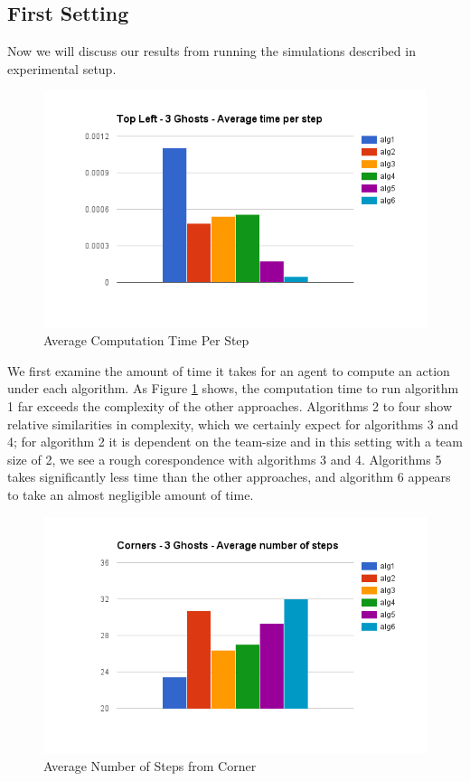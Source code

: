 \documentclass[11pt]{article}
\begin{document}
\begin{multicols}{2}
\subsection{First Setting}
Now we will discuss our results from running the simulations described in experimental setup. 


\begin{figure}[H]
	\includegraphics[width=\columnwidth]{time.png}
	\caption{Average Computation Time Per Step}
	\label{fig:averagecomputation}
\end{figure}	

We first examine the amount of time it takes for an agent to compute an action under each algorithm. As Figure \ref{fig:averagecomputation} shows, the computation time to run algorithm 1 far exceeds the complexity of the other approaches. Algorithms 2 to four show relative similarities in complexity, which we certainly expect for algorithms 3 and 4; for algorithm 2 it is dependent on the team-size and in this setting with a team size of 2, we see a rough corespondence with algorithms 3 and 4. Algorithms 5 takes significantly less time than the other approaches, and algorithm 6 appears to take an almost negligible amount of time. 

\begin{figure}[H]
	\includegraphics[width=\columnwidth]{cornersteps.png}
	\caption{Average Number of Steps from Corner}
	\label{fig:averagenumstepscorner}
\end{figure}


\end{multicols}
\end{document}
